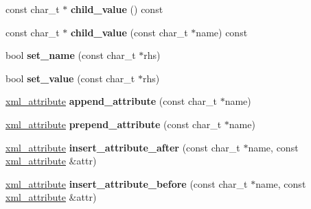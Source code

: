 \begin{DoxyCompactItemize}
\item 
\hypertarget{classpugi_1_1xml__node_a1c824a58d4c591c0da8f5dc39938456f}{const char\-\_\-t $\ast$ {\bfseries child\-\_\-value} () const }\label{classpugi_1_1xml__node_a1c824a58d4c591c0da8f5dc39938456f}

\item 
\hypertarget{classpugi_1_1xml__node_ad091dcc0ff970fb2920b8b2942154c94}{const char\-\_\-t $\ast$ {\bfseries child\-\_\-value} (const char\-\_\-t $\ast$name) const }\label{classpugi_1_1xml__node_ad091dcc0ff970fb2920b8b2942154c94}

\item 
\hypertarget{classpugi_1_1xml__node_a9d688489fcf0960e945a12480419e434}{bool {\bfseries set\-\_\-name} (const char\-\_\-t $\ast$rhs)}\label{classpugi_1_1xml__node_a9d688489fcf0960e945a12480419e434}

\item 
\hypertarget{classpugi_1_1xml__node_a160f1fa7a0eda1e5ad9d19d45f6b0e4e}{bool {\bfseries set\-\_\-value} (const char\-\_\-t $\ast$rhs)}\label{classpugi_1_1xml__node_a160f1fa7a0eda1e5ad9d19d45f6b0e4e}

\item 
\hypertarget{classpugi_1_1xml__node_a417eb03f034b432bb2800e54e38022aa}{\hyperlink{classpugi_1_1xml__attribute}{xml\-\_\-attribute} {\bfseries append\-\_\-attribute} (const char\-\_\-t $\ast$name)}\label{classpugi_1_1xml__node_a417eb03f034b432bb2800e54e38022aa}

\item 
\hypertarget{classpugi_1_1xml__node_a7d70631d6cb3624cdfc4cf9ef4abad06}{\hyperlink{classpugi_1_1xml__attribute}{xml\-\_\-attribute} {\bfseries prepend\-\_\-attribute} (const char\-\_\-t $\ast$name)}\label{classpugi_1_1xml__node_a7d70631d6cb3624cdfc4cf9ef4abad06}

\item 
\hypertarget{classpugi_1_1xml__node_a74ab20fa84dffde317f8899af628f041}{\hyperlink{classpugi_1_1xml__attribute}{xml\-\_\-attribute} {\bfseries insert\-\_\-attribute\-\_\-after} (const char\-\_\-t $\ast$name, const \hyperlink{classpugi_1_1xml__attribute}{xml\-\_\-attribute} \&attr)}\label{classpugi_1_1xml__node_a74ab20fa84dffde317f8899af628f041}

\item 
\hypertarget{classpugi_1_1xml__node_a742898bc2342d943a4c49916ac3a64b8}{\hyperlink{classpugi_1_1xml__attribute}{xml\-\_\-attribute} {\bfseries insert\-\_\-attribute\-\_\-before} (const char\-\_\-t $\ast$name, const \hyperlink{classpugi_1_1xml__attribute}{xml\-\_\-attribute} \&attr)}\label{classpugi_1_1xml__node_a742898bc2342d943a4c49916ac3a64b8}


\end{DoxyCompactItemize}
